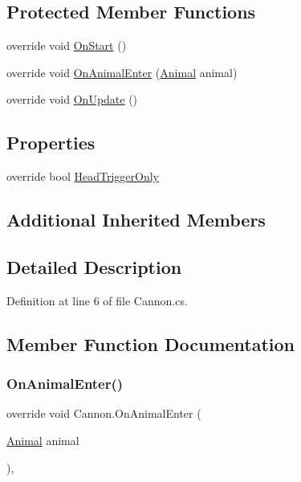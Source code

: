 \subsection*{Protected Member Functions}
\begin{DoxyCompactItemize}
\item 
override void \mbox{\hyperlink{class_cannon_ab530656c8ae8981ced0162cfdd8f9cb2}{On\+Start}} ()
\item 
override void \mbox{\hyperlink{class_cannon_a972f062f1aba8d3f3ab95e47c6129506}{On\+Animal\+Enter}} (\mbox{\hyperlink{class_animal}{Animal}} animal)
\item 
override void \mbox{\hyperlink{class_cannon_aa5d69c897923c5ac5bdcc16b18f1cf85}{On\+Update}} ()
\end{DoxyCompactItemize}
\subsection*{Properties}
\begin{DoxyCompactItemize}
\item 
override bool \mbox{\hyperlink{class_cannon_ab764ca13d521eb8329aa9520e91842d4}{Head\+Trigger\+Only}}
\end{DoxyCompactItemize}
\subsection*{Additional Inherited Members}


\subsection{Detailed Description}


Definition at line 6 of file Cannon.\+cs.



\subsection{Member Function Documentation}
\mbox{\label{class_cannon_a972f062f1aba8d3f3ab95e47c6129506}} 
\subsubsection{\texorpdfstring{On\+Animal\+Enter()}{OnAnimalEnter()}}
{\footnotesize\ttfamily override void Cannon.\+On\+Animal\+Enter (\begin{DoxyParamCaption}\item[{\mbox{\hyperlink{class_animal}{Animal}}}]{animal }\end{DoxyParamCaption})\hspace{0.3cm}{\ttfamily [protected]}, {\ttfamily [virtual]}}



